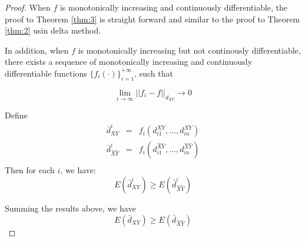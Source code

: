 \documentclass[12pt,letterpaper]{article}
\begin{document}
\begin{proof}
  When $f$ is monotonically increasing and continuously
  differentiable, the proof to Theorem \ref{thm:3} is straight forward
  and similar to the proof to Theorem \ref{thm:2} usin delta method.

  In addition, when $f$ is monotonically increasing but not
  continously differentiable, there exists a sequence of monotonically
  increasing and continuously differentiable functions
  $\{f_i(\cdot)\}_{i=1}^{+\infty}$, such that
  
  \begin{equation}
    \lim_{i \to \infty} ||f_i - f||_{d_{XY}} \to 0
  \end{equation}

  Define 
  \begin{eqnarray*}
    \bar{d}^{i}_{XY} &=& f_i(d^{XY}_{i1},\ldots,d^{XY}_{in})\\ 
    \bar{d}^{i}_{\hat{X}\hat{Y}} &=& f_i(d^{\hat{X}\hat{Y}}_{i1},\ldots,d^{\hat{X}\hat{Y}}_{in})\\
  \end{eqnarray*}
  Then for each $i$, we have:
  \begin{displaymath}
    E(\bar{d}^i_{XY}) \ge E(\bar{d}^i_{\hat{X}\hat{Y}})
  \end{displaymath}

  Summing the results above, we have 
  \begin{equation}
    E(\bar{d}_{XY}) \ge E(\bar{d}_{\hat{X}\hat{Y}})
  \end{equation}
\end{proof}



\end{document}
